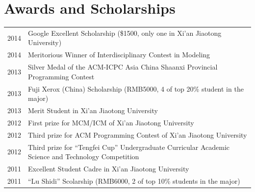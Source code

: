 \documentclass[letterpaper,11pt]{article}
\begin{document}
\section{Awards and Scholarships}

\begin{tabular}{lp{15cm}}
    2014 & Google Excellent Scholarship (\$1500, only one in Xi'an Jiaotong University) \\
    2014 & Meritorious Winner of Interdisciplinary Contest in Modeling \\
    2013 & Silver Medal of the ACM-ICPC Asia China
            \newline Shaanxi Provincial Programming Contest \\
    2013 & Fuji Xerox (China) Scholarship (RMB5000, 4 of top 20\% student in the major) \\
    2013 & Merit Student in Xi'an Jiaotong University \\
    2012 & First prize for MCM/ICM of Xi'an Jiaotong University \\
    2012 & Third prize for ACM Programming Contest of Xi'an Jiaotong University \\
    2012 & Third prize for ``Tengfei Cup'' Undergraduate
            \newline Curricular Academic Science and Technology Competition \\
    2011 & Excellent Student Cadre in Xi'an Jiaotong University  \\
    2011 & ``Lu Shidi'' Scolarship (RMB6000, 2 of top 10\% students in the major)
\end{tabular}
\end{document}
